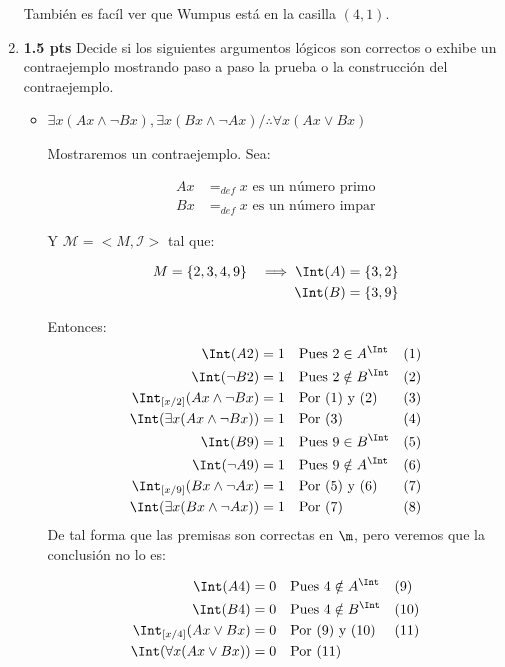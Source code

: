 \documentclass[11pt,letterpaper]{article}
\begin{document}
\begin{enumerate}
  También es facíl ver que Wumpus está en la casilla $(4,1)$. 
\item {\bf 1.5 pts} Decide si los siguientes argumentos lógicos son correctos o exhibe un contraejemplo mostrando paso a paso la prueba o la construcción del contraejemplo.
  \begin{itemize}
  \item $\exists x(Ax\land\lnot Bx),\exists x(Bx\land\lnot Ax) / \therefore \forall x (Ax\lor Bx)$
    
    Mostraremos un contraejemplo. Sea:
    
    \begin{align*}
      Ax &=_{def} x \text{ es un número primo}\\
      Bx &=_{def} x \text{ es un número impar}
    \end{align*}

    Y $\mathcal{M} = <M, \mathcal{I}>$ tal que:
    
    \begin{align*}
      M &= \{2,3,4,9\} &\implies \Int(A) &= \{3,2\}\\
      & & \Int(B) &= \{3, 9\}\\
    \end{align*}

    Entonces:
    \begin{align*}
      \Int(A2) &= 1 & &\text{Pues } 2 \in A^\Int & &(1)\\
      \Int(\neg B2) &= 1 & &\text{Pues } 2 \notin B^\Int & &(2)\\
      \Int_{[x/2]}(Ax \land\lnot Bx) &= 1 & &\text{Por $(1)$ y $(2)$} & &(3)\\
      \Int(\exists x(Ax\land\lnot Bx)) &= 1 & &\text{Por $(3)$} & &(4)\\
      \Int(B9) &= 1 & &\text{Pues } 9 \in B^\Int & &(5)\\
      \Int(\neg A9) &= 1 & &\text{Pues } 9 \notin A^\Int & &(6)\\
      \Int_{[x/9]}(Bx \land\lnot Ax) &= 1 & &\text{Por $(5)$ y $(6)$} & &(7)\\
      \Int(\exists x(Bx\land\lnot Ax)) &= 1 & &\text{Por }(7) & &(8)\\
    \end{align*}
    De tal forma que las premisas son correctas en $\m$, pero veremos
    que la conclusión no lo es:

    \begin{align*}
      \Int(A4) &= 0 & &\text{Pues } 4\notin A^\Int & &(9)\\
      \Int(B4) &= 0 & &\text{Pues } 4\notin B^\Int & &(10)\\
      \Int_{[x/4]}(Ax\lor Bx) &= 0 & &\text{Por $(9)$ y $(10)$} & &(11)\\
      \Int(\forall x (Ax\lor Bx)) &= 0 & &\text{Por $(11)$}
    \end{align*}


\end{itemize}
\end{enumerate}
\end{document}
